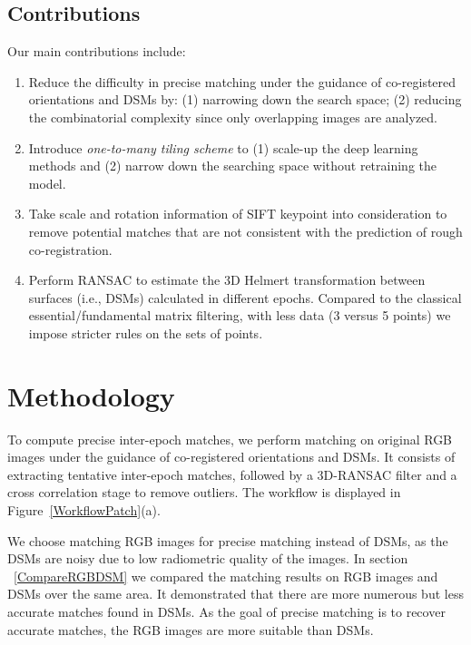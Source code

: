 \subsection{Contributions}
Our main contributions include:\\
\begin{enumerate}
	\item Reduce the difficulty in precise matching under the guidance of co-registered orientations and DSMs by: (1) narrowing down the search space; (2) reducing the combinatorial complexity since only overlapping images are analyzed.
	\item Introduce \textit{one-to-many tiling scheme} to (1) scale-up the deep learning methods and (2) narrow down the searching space without retraining the model.
	\item Take scale and rotation information of SIFT keypoint into consideration to remove potential matches that are not consistent with the prediction of rough co-registration.
	\item Perform RANSAC to estimate the 3D Helmert transformation between surfaces (i.e., DSMs) calculated in different epochs. Compared to the classical essential/fundamental matrix filtering, with less data (3 versus 5 points) we impose stricter rules on the sets of points. 
\end{enumerate}

\section{Methodology}
To compute precise {inter-epoch} matches, we perform matching on original RGB images {under the guidance of co-registered orientations and DSMs}. {It consists of extracting tentative inter-epoch matches, followed by a 3D-RANSAC filter and a cross correlation stage to remove outliers.} The workflow is displayed in Figure~\ref{WorkflowPatch}(a).
\par
We choose matching RGB images for precise matching instead of DSMs, as the DSMs are noisy due to low radiometric quality of the images. In section ~\ref{CompareRGBDSM} %
we compared the matching results on RGB images and DSMs over the same area. It demonstrated that there are more numerous but less accurate matches found in DSMs. As the goal of precise matching is to recover accurate matches, the RGB images are more suitable than DSMs.\\

